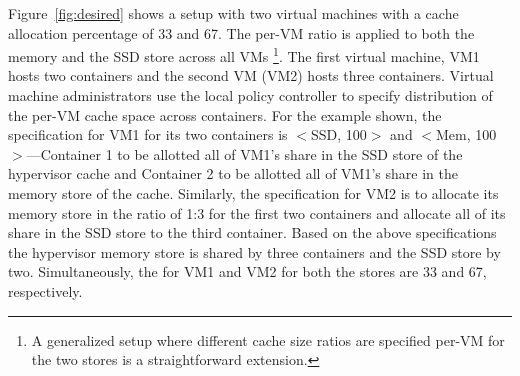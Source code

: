 Figure~\ref{fig:desired} shows a setup with two virtual machines
with a cache allocation  percentage of 33 and 67. 
The per-VM ratio is
applied to both the memory and the SSD store across all VMs
\footnote{A generalized setup where different cache size
ratios are specified per-VM for the two stores is a straightforward
extension.}.
%
The first virtual machine, VM1 hosts two containers and the second VM (VM2)
hosts three containers.
%
%
%
Virtual machine administrators use the local policy controller
to specify distribution of the per-VM cache space across containers.
%
For the example shown, the specification for VM1 for its two
containers is $<$SSD, 100$>$ and $<$Mem, 100$>$---Container 1 to be allotted
all of VM1's share in the SSD store of the hypervisor cache and Container 2
to be allotted all of VM1's share in the memory store of the cache.
%
Similarly, the specification for VM2 is to allocate its memory
store in the ratio of 1:3 for the first two containers and allocate
all of its share in the SSD store to the third container.
%
%
%
%
%
Based on the above specifications the hypervisor memory store
is shared by three containers and the SSD store by two.
%
Simultaneously, the  for VM1 and VM2 for both the stores
are 33 and 67, respectively.
%
%
%
%

